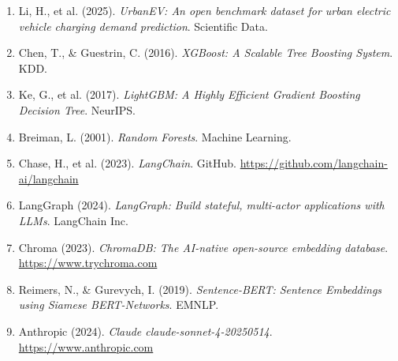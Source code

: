 \documentclass[12pt,a4paper]{article}
\begin{document}
\begin{enumerate}
  \item Li, H., et al. (2025). \textit{UrbanEV: An open benchmark dataset for urban
        electric vehicle charging demand prediction}. Scientific Data.
  \item Chen, T., \& Guestrin, C. (2016). \textit{XGBoost: A Scalable Tree Boosting
        System}. KDD.
  \item Ke, G., et al. (2017). \textit{LightGBM: A Highly Efficient Gradient Boosting
        Decision Tree}. NeurIPS.
  \item Breiman, L. (2001). \textit{Random Forests}. Machine Learning.
  \item Chase, H., et al. (2023). \textit{LangChain}. GitHub.
        \url{https://github.com/langchain-ai/langchain}
  \item LangGraph (2024). \textit{LangGraph: Build stateful, multi-actor applications
        with LLMs}. LangChain Inc.
  \item Chroma (2023). \textit{ChromaDB: The AI-native open-source embedding database}.
        \url{https://www.trychroma.com}
  \item Reimers, N., \& Gurevych, I. (2019). \textit{Sentence-BERT: Sentence Embeddings
        using Siamese BERT-Networks}. EMNLP.
  \item Anthropic (2024). \textit{Claude claude-sonnet-4-20250514}. \url{https://www.anthropic.com}
\end{enumerate}
\end{document}

